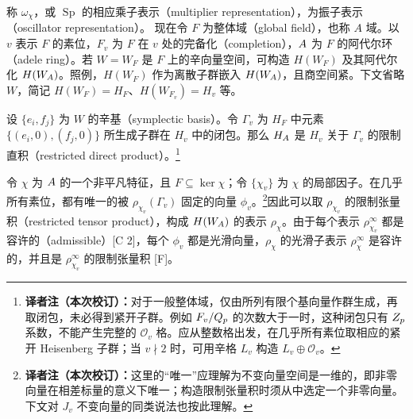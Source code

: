 称 $\omega_\chi$，或 $\operatorname{Sp}$ 的相应乘子表示（multiplier representation），为振子表示（oscillator representation）。
现在令 $F$ 为整体域（global field），也称 $A$ 域。以 $v$ 表示 $F$ 的素位，$F_v$ 为 $F$ 在 $v$ 处的完备化（completion），$A$ 为 $F$ 的阿代尔环（adele ring）。若 $W=W_F$ 是 $F$ 上的辛向量空间，可构造 $H(W_F)$ 及其阿代尔化 $H(W_A)$。照例，$H(W_F)$ 作为离散子群嵌入 $H(W_A)$，且商空间紧。下文省略 $W$，简记 $H(W_F)=H_F$、$H(W_{F_v})=H_v$ 等。

设 $\{e_i,f_j\}$ 为 $W$ 的辛基（symplectic basis）。令 $\Gamma_v$ 为 $H_F$ 中元素 $\{(e_i,0),(f_j,0)\}$ 所生成子群在 $H_v$ 中的闭包。那么 $H_A$ 是 $H_v$ 关于 $\Gamma_v$ 的限制直积（restricted direct product）。\footnote{\textbf{译者注（本次校订）：}对于一般整体域，仅由所列有限个基向量作群生成，再取闭包，未必得到紧开子群。例如 $F_v/Q_p$ 的次数大于一时，这种闭包只有 $Z_p$ 系数，不能产生完整的 $\mathcal O_v$ 格。应从整数格出发，在几乎所有素位取相应的紧开 Heisenberg 子群；当 $v\nmid2$ 时，可用辛格 $L_v$ 构造 $L_v\oplus\mathcal O_v$。}

令 $\chi$ 为 $A$ 的一个非平凡特征，且 $F\subseteq\ker\chi$；令 $\{\chi_v\}$ 为 $\chi$ 的局部因子。在几乎所有素位，都有唯一的被 $\rho_{\chi_v}(\Gamma_v)$ 固定的向量 $\phi_v$。\footnote{\textbf{译者注（本次校订）：}这里的“唯一”应理解为不变向量空间是一维的，即非零向量在相差标量的意义下唯一；构造限制张量积时须从中选定一个非零向量。下文对 $J_v$ 不变向量的同类说法也按此理解。}因此可以取 $\rho_{\chi_v}$ 的限制张量积（restricted tensor product），构成 $H(W_A)$ 的表示 $\rho_\chi$。由于每个表示 $\rho_{\chi_v}^\infty$ 都是容许的（admissible）[C 2]，每个 $\phi_v$ 都是光滑向量，$\rho_\chi$ 的光滑子表示 $\rho_\chi^\infty$ 是容许的，并且是 $\rho_{\chi_v}^\infty$ 的限制张量积 [F]。

